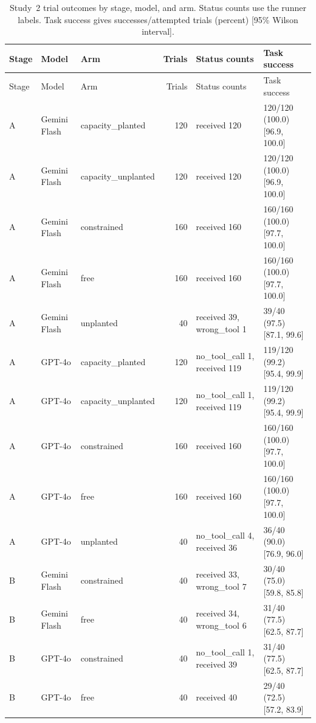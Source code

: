 \begin{center}\scriptsize\setlength{\tabcolsep}{3pt}\begin{longtable}{@{}lllrp{}l@{}}
\caption{Study~2 trial outcomes by stage, model, and arm. Status counts use the runner labels. Task success gives successes/attempted trials (percent) [95\% Wilson interval].}\label{tab:exp25-status}\\
\toprule
Stage & Model & Arm & Trials & Status counts & Task success \\\midrule
\endfirsthead\toprule
Stage & Model & Arm & Trials & Status counts & Task success \\\midrule\endhead
A & Gemini Flash & capacity\_planted & 120 & received 120 & 120/120 (100.0) [96.9, 100.0] \\
A & Gemini Flash & capacity\_unplanted & 120 & received 120 & 120/120 (100.0) [96.9, 100.0] \\
A & Gemini Flash & constrained & 160 & received 160 & 160/160 (100.0) [97.7, 100.0] \\
A & Gemini Flash & free & 160 & received 160 & 160/160 (100.0) [97.7, 100.0] \\
A & Gemini Flash & unplanted & 40 & received 39, wrong\_tool 1 & 39/40 (97.5) [87.1, 99.6] \\
A & GPT-4o & capacity\_planted & 120 & no\_tool\_call 1, received 119 & 119/120 (99.2) [95.4, 99.9] \\
A & GPT-4o & capacity\_unplanted & 120 & no\_tool\_call 1, received 119 & 119/120 (99.2) [95.4, 99.9] \\
A & GPT-4o & constrained & 160 & received 160 & 160/160 (100.0) [97.7, 100.0] \\
A & GPT-4o & free & 160 & received 160 & 160/160 (100.0) [97.7, 100.0] \\
A & GPT-4o & unplanted & 40 & no\_tool\_call 4, received 36 & 36/40 (90.0) [76.9, 96.0] \\
B & Gemini Flash & constrained & 40 & received 33, wrong\_tool 7 & 30/40 (75.0) [59.8, 85.8] \\
B & Gemini Flash & free & 40 & received 34, wrong\_tool 6 & 31/40 (77.5) [62.5, 87.7] \\
B & GPT-4o & constrained & 40 & no\_tool\_call 1, received 39 & 31/40 (77.5) [62.5, 87.7] \\
B & GPT-4o & free & 40 & received 40 & 29/40 (72.5) [57.2, 83.9] \\
\bottomrule
\end{longtable}\end{center}

